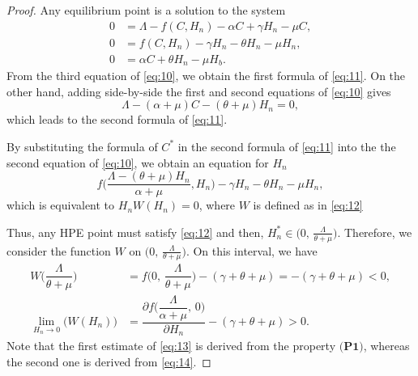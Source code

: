 \documentclass[10pt,a4paper]{amsart}
\begin{document}
\begin{proof}
Any equilibrium point is a solution to the system
\begin{equation}\label{eq:10}
\begin{split}
0 &= \Lambda - f(C, H_n) -\alpha C + \gamma H_n -\mu C, \\
0 &= f(C, H_n) - \gamma H_n - \theta H_n - \mu H_n,\\
0 &= \alpha C + \theta H_n - \mu H_b.
\end{split}
\end{equation}
From the third equation of \eqref{eq:10}, we obtain the first formula of \eqref{eq:11}. 
On the other hand, adding side-by-side the first and second equations of \eqref{eq:10} gives
\begin{equation*}
    \Lambda - (\alpha + \mu)C - (\theta + \mu)H_n = 0,
\end{equation*}
which leads to the second formula of \eqref{eq:11}.

By substituting the formula of $C^*$ in the second formula of \eqref{eq:11} into the the second equation of \eqref{eq:10}, we obtain an equation for $H_n$
\begin{equation*}
    f\bigg(\dfrac{\Lambda - (\theta + \mu)H_n}{\alpha + \mu}, H_n\bigg) - \gamma H_n - \theta H_n - \mu H_n,
\end{equation*}
which is equivalent to $H_nW(H_n) = 0$, where $W$ is defined as in \eqref{eq:12}

Thus, any HPE point must satisfy \eqref{eq:12} and then, $H_n^* \in \bigl(0,\,\frac{\Lambda}{\theta + \mu}\bigr)$. 
Therefore, we consider the function $W$ on $\big(0,\,\frac{\Lambda}{\theta + \mu}\big)$.
On this interval, we have
\begin{equation}\label{eq:13}
\begin{split}
W\bigg(\dfrac{\Lambda}{\theta + \mu}\bigg) &= f\bigg(0,\, \dfrac{\Lambda}{\theta + \mu}\bigg) - (\gamma + \theta + \mu) = -(\gamma + \theta + \mu) < 0,\\
\lim_{H_n \to 0}\bigl(W(H_n)\bigr) &= \dfrac{\partial f\bigg(\dfrac{\Lambda}{\alpha + \mu},\,0\bigg)}{\partial H_n} - (\gamma + \theta + \mu) > 0.
\end{split}
\end{equation}
Note that the first estimate of \eqref{eq:13} is derived from the property $\textbf{(P1)}$, whereas the second one is derived from \eqref{eq:14}.


\end{proof}
\end{document}
